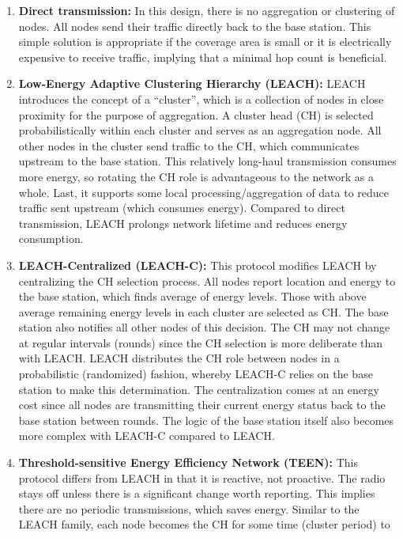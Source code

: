 \begin{enumerate}
  \item \textbf{Direct transmission:} In this design, there is no aggregation
  or clustering of nodes. All nodes send their traffic directly back to the
  base station. This simple solution is appropriate if the coverage area is
  small or it is electrically expensive to receive traffic, implying that a
  minimal hop count is beneficial.
  \item \textbf{Low-Energy Adaptive Clustering Hierarchy (LEACH):} LEACH
  introduces the concept of a ``cluster'', which is a collection of nodes in
  close proximity for the purpose of aggregation. A cluster head (CH) is
  selected probabilistically within each cluster and serves as an aggregation
  node. All other nodes in the cluster send traffic to the CH, which
  communicates upstream to the base station. This relatively long-haul
  transmission consumes more energy, so rotating the CH role is advantageous
  to the network as a whole.  Last, it supports some local
  processing/aggregation of data to reduce traffic sent upstream (which
  consumes energy). Compared to direct transmission, LEACH prolongs network
  lifetime and reduces energy consumption.
  \item \textbf{LEACH-Centralized (LEACH-C):} This protocol modifies LEACH by
  centralizing the CH selection process. All nodes report location and energy
  to the base station, which finds average of energy levels. Those with above
  average remaining energy levels in each cluster are selected as CH\@. The base
  station also notifies all other nodes of this decision. The CH may not
  change at regular intervals (rounds) since the CH selection is more
  deliberate than with LEACH\@. LEACH distributes the CH role between nodes in a
  probabilistic (randomized) fashion, whereby LEACH-C relies on the base
  station to make this determination. The centralization comes at an energy
  cost since all nodes are transmitting their current energy status back to
  the base station between rounds. The logic of the base station itself also
  becomes more complex with LEACH-C compared to LEACH\@.
  \item \textbf{Threshold-sensitive Energy Efficiency Network (TEEN):} This
  protocol differs from LEACH in that it is reactive, not proactive. The radio
  stays off unless there is a significant change worth reporting. This implies
  there are no periodic transmissions, which saves energy. Similar to the
  LEACH family, each node becomes the CH for some time (cluster period) to

\end{enumerate}
